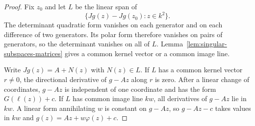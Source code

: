 \documentclass[reqno]{amsart}
\numberwithin{equation}{section}
\theoremstyle{definition}
\begin{document}
\begin{proof}
Fix $z_0$ and let $L$ be the linear span of
\[
  \{Jg(z)-Jg(z_0):z\in k^2\}.
\]
The determinant quadratic form vanishes on each generator and on each
difference of two generators.  Its polar form therefore vanishes on pairs of
generators, so the determinant vanishes on all of $L$.
Lemma~\ref{lem:singular-subspaces-matrices} gives a common kernel vector or a
common image line.

Write $Jg(z)=A+N(z)$ with $N(z)\in L$.  If $L$ has a common kernel vector
$r\neq 0$, the directional derivative of $g-Az$ along $r$ is zero.  After a
linear change of coordinates, $g-Az$ is independent of one coordinate and has
the form $G(\ell(z))+c$.  If $L$ has common image line $kw$, all derivatives of
$g-Az$ lie in $kw$.  A linear form annihilating $w$ is constant on $g-Az$, so
$g-Az-c$ takes values in $kw$ and $g(z)=Az+w\varphi(z)+c$.
\end{proof}
\end{document}
